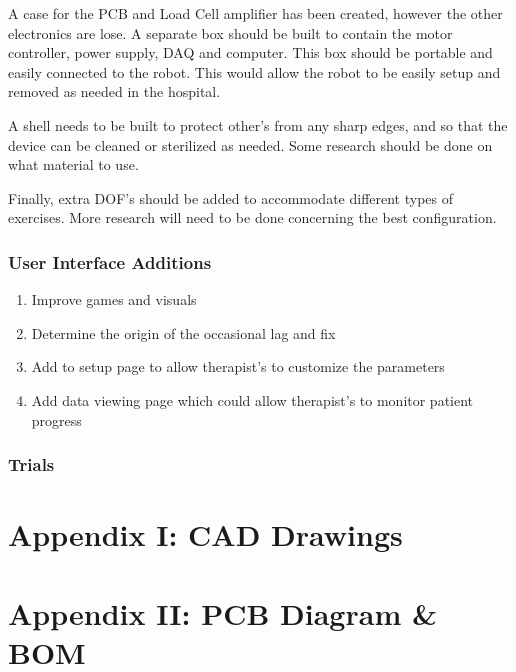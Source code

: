 \documentclass[12pt]{report}
\begin{document}
	A case for the PCB and Load Cell amplifier has been created, however the other electronics are lose. A separate box should be built to contain the motor controller, power supply, DAQ and computer. This box should be portable and easily connected to the robot. This would allow the robot to be easily setup and removed as needed in the hospital. 
	
	A shell needs to be built to protect other's from any sharp edges, and so that the device can be cleaned or sterilized as needed. Some research should be done on what material to use. 
	
	Finally, extra DOF's should be added to accommodate different types of exercises. More research will need to be done concerning the best configuration. 
	
	\subsection{User Interface Additions}
	
	\begin{enumerate}
		\item Improve games and visuals
		\item Determine the origin of the occasional lag and fix
		\item Add to setup page to allow therapist's to customize the parameters
		\item Add data viewing page which could allow therapist's to monitor patient progress
	\end{enumerate}
	
	\subsection{Trials}
	
	
\chapter*{Appendix I: CAD Drawings}
\chapter*{Appendix II: PCB Diagram \& BOM}
\end{document}

